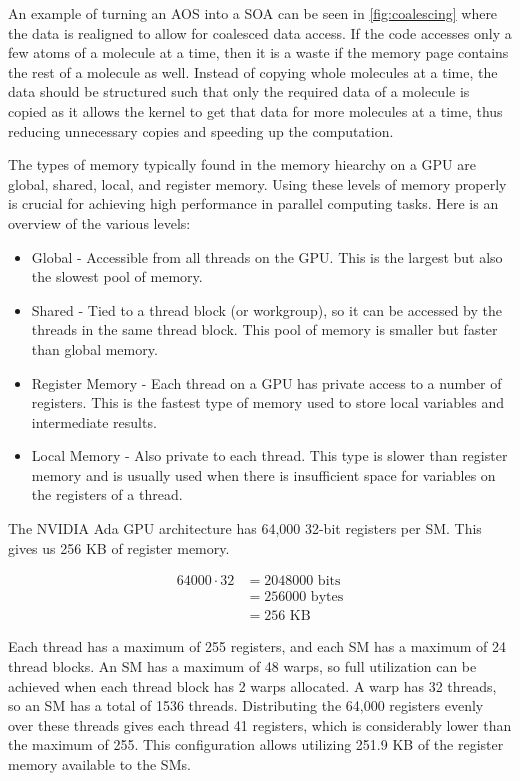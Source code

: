 An example of turning an AOS into a SOA can be seen in \autoref{fig:coalescing} where the data is realigned to allow for coalesced data access. If the code accesses only a few atoms of a molecule at a time, then it is a waste if the memory page contains the rest of a molecule as well. Instead of copying whole molecules at a time, the data should be structured such that only the required data of a molecule is copied as it allows the kernel to get that data for more molecules at a time, thus reducing unnecessary copies and speeding up the computation. 

The types of memory typically found in the memory hiearchy on a GPU are global, shared, local, and register memory. Using these levels of memory properly is crucial for achieving high performance in parallel computing tasks. Here is an overview of the various levels:

\begin{itemize}
  \item Global - Accessible from all threads on the GPU. This is the largest but also the slowest pool of memory.
  \item Shared - Tied to a thread block (or workgroup), so it can be accessed by the threads in the same thread block. This pool of memory is smaller but faster than global memory.
  \item Register Memory - Each thread on a GPU has private access to a number of registers. This is the fastest type of memory used to store local variables and intermediate results.
  \item Local Memory - Also private to each thread. This type is slower than register memory and is usually used when there is insufficient space for variables on the registers of a thread.
\end{itemize}


The NVIDIA Ada GPU architecture\cite{nvidia-ada-tuning-guide} has 64,000 32-bit registers per SM. This gives us 256 KB of register memory.

\begin{equation}
\begin{split}
  64000 \cdot 32 &= 2048000 \text{ bits}\\
  &= 256000 \text{ bytes}\\
  &= 256 \text{ KB}
\end{split}
\end{equation}

Each thread has a maximum of 255 registers, and each SM has a maximum of 24 thread blocks. An SM has a maximum of 48 warps, so full utilization can be achieved when each thread block has 2 warps allocated. A warp has 32 threads, so an SM has a total of 1536 threads.
Distributing the 64,000 registers evenly over these threads gives each thread 41 registers, which is considerably lower than the maximum of 255. This configuration allows utilizing 251.9 KB of the register memory available to the SMs.

